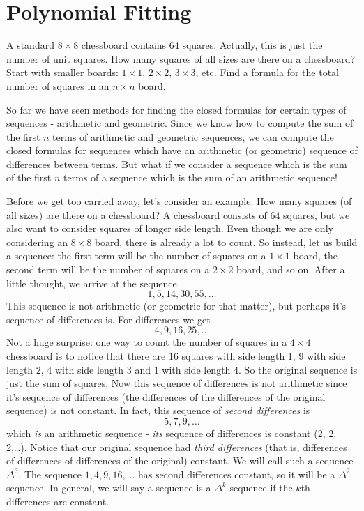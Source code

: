 \documentclass[12pt]{article}
\begin{document}
\section{Polynomial Fitting}\label{sec:polyfit}

\begin{activity}
A standard $8 \times 8$ chessboard contains 64 squares.  Actually, this is just the number of unit squares.  How many squares of all sizes are there on a chessboard?  Start with smaller boards: $1\times 1$, $2 \times 2$, $3\times 3$, etc.  Find a formula for the total number of squares in an $n\times n$ board.
\end{activity}

So far we have seen methods for finding the closed formulas for certain types of sequences - arithmetic and geometric.  Since we know how to compute the sum of the first $n$ terms of arithmetic and geometric sequences, we can compute the closed formulas for sequences which have an arithmetic (or geometric) sequence of differences between terms.  But what if we consider a sequence which is the sum of the first $n$ terms of a sequence which is the sum of an arithmetic sequence!

Before we get too carried away, let's consider an example: How many squares (of all sizes) are there on a chessboard?  A chessboard consists of $64$ squares, but we also want to consider squares of longer side length.  Even though we are only considering an $8 \times 8$ board, there is already a lot to count.  So instead, let us build a sequence: the first term will be the number of squares on a $1 \times 1$ board, the second term will be the number of squares on a $2 \times 2$ board, and so on.  After a little thought, we arrive at the sequence
\[1,5,14,30, 55,\ldots\]
This sequence is not arithmetic (or geometric for that matter), but perhaps it's sequence of differences is.  For differences we get
\[4, 9, 16, 25, \ldots\]
Not a huge surprise: one way to count the number of squares in a $4 \times 4$ chessboard is to notice that there are $16$ squares with side length 1, 9 with side length 2, 4 with side length 3 and 1 with side length 4.  So the original sequence is just the sum of squares.  Now this sequence of differences is not arithmetic since it's sequence of differences (the differences of the differences of the original sequence) is not constant.  In fact, this sequence of {\em second differences} is
\[5, 7, 9, \ldots\]
which {\em is} an arithmetic sequence - {\em its} sequence of differences is constant (2, 2, 2,\ldots).  Notice that our original sequence had {\em third differences} (that is, differences of differences of differences of the original) constant.  We will call such a sequence $\Delta^3$.  The sequence $1, 4, 9, 16, \ldots$ has second differences constant, so it will be a $\Delta^2$ sequence. In general, we will say a sequence is a $\Delta^k$ sequence if the $k$th differences are constant.
\end{document}
